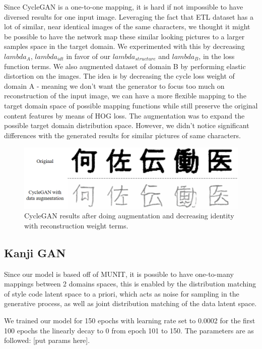 \documentclass[12pt]{report}
\begin{document}
Since CycleGAN is a one-to-one mapping, it is hard if not impossible to have diversed results for one input image. Leveraging the fact that ETL dataset has a lot of similar, near identical images of the same characters, we thought it might be possible to have the network map these similar looking pictures to a larger samples space in the target domain. We experimented with this by decreasing $lambda_A$, $lambda_{idt}$ in favor of our $lambda_{structure}$ and $lambda_B$, in the loss function terms. We also augmented dataset of domain B by performing elastic distortion on the images. The idea is by decreasing the cycle loss weight of domain A - meaning we don't want the generator to focus too much on reconstruction of the input image, we can have a more flexible mapping to the target domain space of possible mapping functions while still preserve the original content features by means of HOG loss. The augmentation was to expand the possible target domain distribution space. However, we didn't notice significant differences with the generated results for similar pictures of same characters.

\begin{figure}[h]
	\centering
	\includegraphics[scale=0.6]{augment-example}
	\caption{CycleGAN results after doing augmentation and decreasing identity with reconstruction weight terms.}
	\label{fig:augment-example}
\end{figure}

\subsection{Kanji GAN}

Since our model is based off of MUNIT, it is possible to have one-to-many mappings between 2 domains spaces, this is enabled by the distribution matching of style code latent space to a priori, which acts as noise for sampling in the generative process, as well as joint distribution matching of the data latent space.

We trained our model for 150 epochs with learning rate set to 0.0002 for the first 100 epochs the linearly decay to 0 from epoch 101 to 150. The parameters are as followed: [put params here]. 
\end{document}
